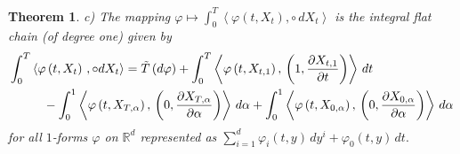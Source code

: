 \documentclass{article}
\newtheorem{theorem}{Theorem}
\begin{document}
\begin{theorem}
c) The mapping $\varphi \mapsto \int_{0}^{T}\left\langle \varphi \left(
t,X_{t}\right) ,\circ \,dX_{t}\right\rangle $ is the integral flat chain (of
degree one) given by
\begin{equation*}
  \begin{split}
\int_{0}^{T} &\left\langle \varphi \left( t,X_{t}\right) \,,\circ
dX_{t}\right\rangle  =\tilde{T}\left( d\varphi \right) 
+\int_{0}^{T}\left\langle \varphi \left( t,X_{t,1}\right) ,\,\left( 1,\frac{%
\partial X_{t,1}}{\partial t}\right) \right\rangle \,dt \\
& \quad -\int_{0}^{1}\left\langle \varphi \left( t,X_{T,\alpha }\right) ,\,\left( 0,%
\frac{\partial X_{T,\alpha }}{\partial \alpha }\right) \right\rangle
\,d\alpha +\int_{0}^{1}\left\langle \varphi \left( t,X_{0,\alpha }\right)
,\,\left( 0,\frac{\partial X_{0,\alpha }}{\partial \alpha }\right)
\right\rangle \,d\alpha    
  \end{split}
\end{equation*}
for all $1$-forms $\varphi $ on $\mathbb{R}^{d}$ represented as 
$
\sum_{i=1}^{d}\varphi _{i}\left( t,y\right) \,dy^{i}+\varphi _{0}\left(
t,y\right) \,dt.
$
\end{theorem}
\end{document}
